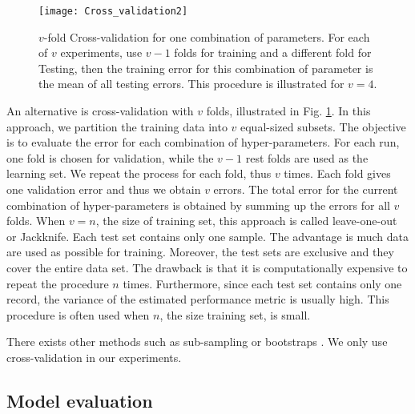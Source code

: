 \begin{figure}[h!]
	\centering
	\texttt{[image: Cross\_validation2]}
	\caption{$v$-fold Cross-validation for one combination of parameters. For each of $v$ experiments, use $v-1$ folds for training and a different fold for Testing, then the training error for this combination of parameter is the mean of all testing errors. This procedure is illustrated for $v=4$.}
	\label{fig:Cross_validation}
\end{figure}

An alternative is cross-validation with $v$ folds, illustrated in Fig. \ref{fig:Cross_validation}. In this approach, we partition the training data into $v$ equal-sized subsets. The objective is to evaluate the error for each combination of hyper-parameters. For each run, one fold is chosen for validation, while the $v-1$ rest folds are used as the learning set. We repeat the process for each fold, thus $v$ times. Each fold gives one validation error and thus we obtain $v$ errors. The total error for the current combination of hyper-parameters is obtained by summing up the errors for all $v$ folds. When $v=n$, the size of training set, this approach is called leave-one-out or Jackknife. Each test set contains only one sample. The advantage is much data are used as possible for training. Moreover, the test sets are exclusive and they cover the entire data set. The drawback is that it is computationally expensive to repeat the procedure $n$ times. Furthermore, since each test set contains only one record, the variance of the estimated performance metric is usually high. This procedure is often used when $n$, the size training set, is small.



\noindent There exists other methods such as sub-sampling or bootstraps \cite{Duda1973,Dreyfus2006}. We only use cross-validation in our experiments.

\subsection{Model evaluation}
